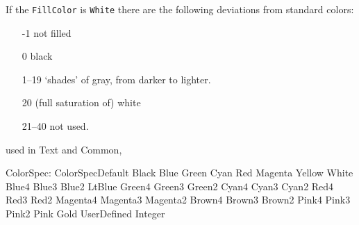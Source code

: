 \documentclass[10pt, a4paper]{article}
\begin{document}
If the \texttt{FillColor} is \texttt{White} there are the following deviations 
from standard colors: 
%
\begin{enumerate}
\item[-1]    not filled
\item[0]     black
\item[1--19]  `shades' of gray, from darker to lighter.
\item[20]    (full saturation of) white
\item[21--40] not used. 
\end{enumerate}



used in Text and Common, 

ColorSpec:
ColorSpecDefault	 
Black	 
Blue	 
Green	 
Cyan	 
Red	 
Magenta	 
Yellow	 
White	 
Blue4	 
Blue3	 
Blue2	 
LtBlue	 
Green4	 
Green3	 
Green2	 
Cyan4	 
Cyan3	 
Cyan2	 
Red4	 
Red3	 
Red2	 
Magenta4	 
Magenta3	 
Magenta2	 
Brown4	 
Brown3	 
Brown2	 
Pink4	 
Pink3	 
Pink2	 
Pink	 
Gold	 
UserDefined Integer	 


{}%
\end{document}
